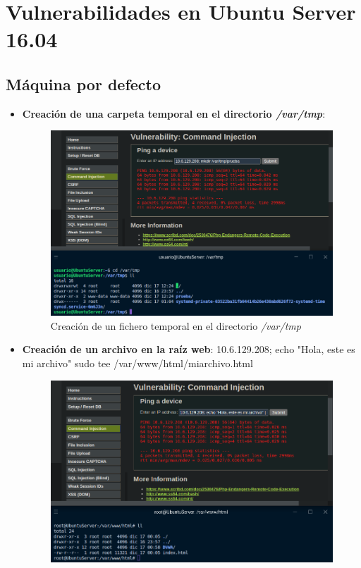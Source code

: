 \documentclass[11pt]{report}
\begin{document}
\section{Vulnerabilidades en Ubuntu Server 16.04}
\subsection{Máquina por defecto}
\begin{itemize}
  \item \textbf{Creación de una carpeta temporal en el directorio \emph{/var/tmp}}:
        \begin{figure}[H]
          \centering
          \includegraphics[scale=0.35]{img/UbuntuServer/UbuntuServer_Base_1.png}
          \caption{Creación de un fichero temporal en el directorio \emph{/var/tmp}}
        \end{figure}
  \item \textbf{Creación de un archivo en la raíz web}: 10.6.129.208; echo "Hola, este es mi archivo" \textbar \space sudo tee /var/www/html/miarchivo.html
        \begin{figure}[H]
          \centering
          \includegraphics[scale=0.35]{img/UbuntuServer/UbuntuServer_Base_2.png}

\end{figure}
\end{itemize}
\end{document}

